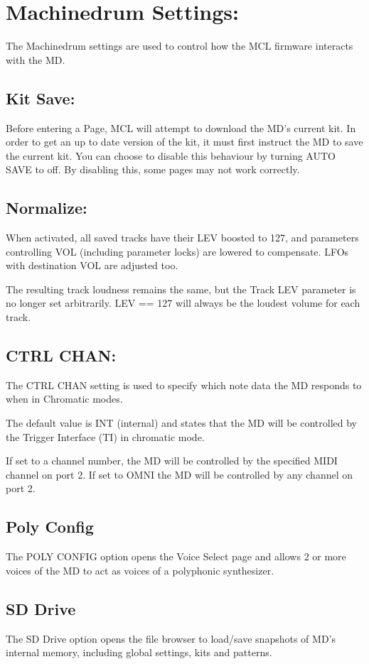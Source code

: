 \chapter{Machinedrum Settings:}
The Machinedrum settings are used to control how the MCL firmware interacts with the MD.

\section{Kit Save:}
Before entering a Page, MCL will attempt to download the MD's current kit. In order to get an up to date version of the kit, it must first instruct the MD to save the current kit. You can choose to disable this behaviour by turning AUTO SAVE to off. By disabling this, some pages may not work correctly.
\section{Normalize:}
When activated, all saved tracks have their LEV boosted to 127, and parameters controlling VOL (including parameter locks) are lowered
to compensate. LFOs with destination VOL are 
adjusted too.

The resulting track loudness remains the same, but the Track LEV parameter is no longer set arbitrarily. LEV == 127 will always be the loudest volume for each track.
\section{CTRL CHAN:}
The CTRL CHAN setting is used to specify which note data the MD responds to when in Chromatic modes.

The default value is INT (internal) and states that the MD will be controlled by the Trigger Interface (TI) in chromatic mode.

If set to a channel number, the MD will be controlled by the specified MIDI channel on port 2. If set to OMNI the MD will be controlled by any channel on port 2.
\section{Poly Config}
The POLY CONFIG option opens the Voice Select page and allows 2 or more voices of the MD to act as voices of a polyphonic synthesizer.
\section{SD Drive}
The SD Drive option opens the file browser to load/save snapshots of MD's internal memory, including global settings, kits and patterns.